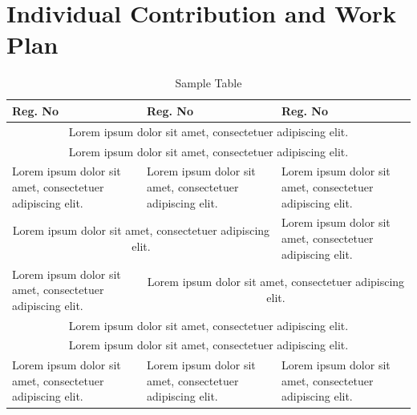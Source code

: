 \section{Individual Contribution and Work Plan}

\begin{table}[H]
    \centering
    \begin{tabularx}{\textwidth}{|X|X|X|}
        \hline \textbf{Reg. No} & \textbf{Reg. No} & \textbf{Reg. No} \\
        
        \hline \multicolumn{3}{|c|}{Lorem ipsum dolor sit amet, consectetuer adipiscing elit.} \\
        
        \hline \multicolumn{3}{|c|}{Lorem ipsum dolor sit amet, consectetuer adipiscing elit.} \\
        
        \hline Lorem ipsum dolor sit amet, consectetuer adipiscing elit. & Lorem ipsum dolor sit amet, consectetuer adipiscing elit. & Lorem ipsum dolor sit amet, consectetuer adipiscing elit. \\
        
        \hline \multicolumn{2}{|c|}{Lorem ipsum dolor sit amet, consectetuer adipiscing elit.} & Lorem ipsum dolor sit amet, consectetuer adipiscing elit. \\
        
        \hline Lorem ipsum dolor sit amet, consectetuer adipiscing elit. & \multicolumn{2}{|c|}{Lorem ipsum dolor sit amet, consectetuer adipiscing elit.}\\
        
        \hline \multicolumn{3}{|c|}{Lorem ipsum dolor sit amet, consectetuer adipiscing elit.} \\
        
        \hline \multicolumn{3}{|c|}{Lorem ipsum dolor sit amet, consectetuer adipiscing elit.} \\
        
        \hline Lorem ipsum dolor sit amet, consectetuer adipiscing elit. & Lorem ipsum dolor sit amet, consectetuer adipiscing elit. & Lorem ipsum dolor sit amet, consectetuer adipiscing elit. \\
        \hline
    \end{tabularx}
    \caption{Sample Table}
\end{table}